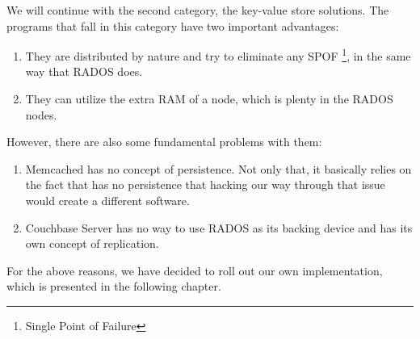 We will continue with the second category, the key-value store solutions. The 
programs that fall in this category have two important advantages:

\begin{enumerate}
	\item They are distributed by nature and try to eliminate any SPOF
		\footnote{Single Point of Failure}, in the same way that RADOS does.
	\item They can utilize the extra RAM of a node, which is plenty in the 
		RADOS nodes.
\end{enumerate}

However, there are also some fundamental problems with them:

\begin{enumerate}
	\item Memcached has no concept of persistence. Not only that, it basically 
		relies on the fact that has no persistence that hacking our way through 
		that issue would create a different software.
	\item Couchbase Server has no way to use RADOS as its backing device and 
		has its own concept of replication.
\end{enumerate}

For the above reasons, we have decided to roll out our own implementation, 
which is presented in the following chapter.

